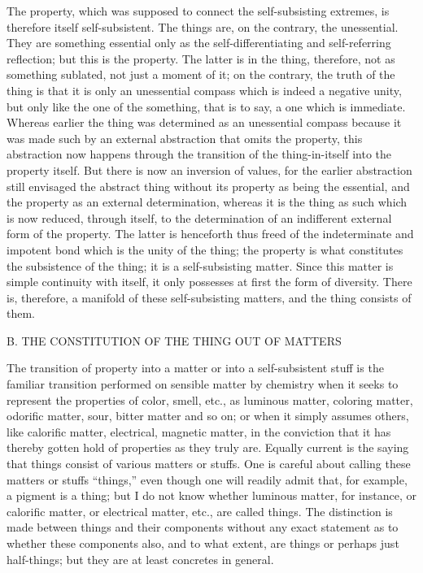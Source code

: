 The property, which was supposed to connect
the self-subsisting extremes,
is therefore itself self-subsistent.
The things are, on the contrary, the unessential.
They are something essential only as
the self-differentiating and self-referring reflection;
but this is the property.
The latter is in the thing,
therefore, not as something sublated, not just a moment of it;
on the contrary, the truth of the thing is
that it is only an unessential compass
which is indeed a negative unity,
but only like the one of the something,
that is to say, a one which is immediate.
Whereas earlier the thing was determined as
an unessential compass because it was made such
by an external abstraction that omits the property,
this abstraction now happens through the transition of
the thing-in-itself into the property itself.
But there is now an inversion of values,
for the earlier abstraction still envisaged the abstract thing
without its property as being the essential,
and the property as an external determination,
whereas it is the thing as such which is now reduced,
through itself, to the determination of
an indifferent external form of the property.
The latter is henceforth thus freed of the indeterminate
and impotent bond which is the unity of the thing;
the property is what constitutes the subsistence of the thing;
it is a self-subsisting matter.
Since this matter is simple continuity with itself,
it only possesses at first the form of diversity.
There is, therefore, a manifold of these self-subsisting matters,
and the thing consists of them.

B. THE CONSTITUTION OF THE THING OUT OF MATTERS

The transition of property into a matter
or into a self-subsistent stuff is the familiar
transition performed on sensible matter by chemistry 
when it seeks to represent the properties of color, smell, etc.,
as luminous matter, coloring matter, odorific matter,
sour, bitter matter and so on;
or when it simply assumes others,
like calorific matter, electrical, magnetic matter,
in the conviction that it has thereby gotten hold
of properties as they truly are.
Equally current is the saying that
things consist of various matters or stuffs.
One is careful about calling these matters or stuffs “things,”
even though one will readily admit that,
for example, a pigment is a thing;
but I do not know whether luminous matter,
for instance, or calorific matter,
or electrical matter, etc., are called things.
The distinction is made between things and their components without
any exact statement as to whether these components also,
and to what extent, are things or perhaps just half-things;
but they are at least concretes in general.

